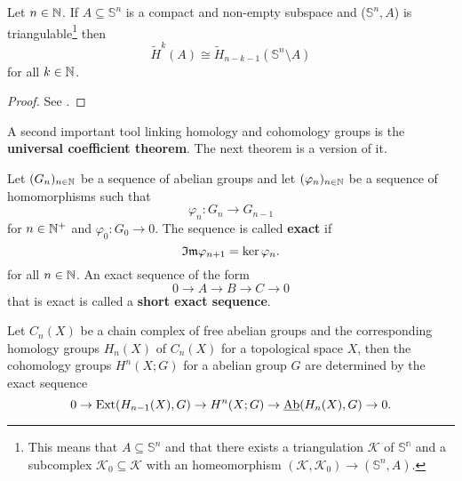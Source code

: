 \begin{thm}\label{thm:alex}
  Let $n \in \mathbb{N}$. If $A \subseteq \mathbb{S}^n$ is a compact and non-empty subspace and ($\mathbb{S}^n, A$) is triangulable\footnote{This means that $A \subseteq \mathbb{S}^n$ and that there exists a triangulation $\mathcal{K}$ of $\mathbb{S^n}$ and a subcomplex $\mathcal{K}_0 \subseteq \mathcal{K}$ with an homeomorphism $(\mathcal{K}, \mathcal{K}_0) \to (\mathbb{S}^n, A)$.} then
  \begin{equation*}
    \tilde{H}^k(A) \cong \tilde{H}_{n-k-1}(\mathbb{S}^n \setminus A)
  \end{equation*}
  for all $k \in \mathbb{N}$.
\end{thm}

\begin{proof}
  See \cite[Theorem 71.1]{MunAlTop}.
\end{proof}

A second important tool linking homology and cohomology groups is the \textbf{universal coefficient theorem}. The next theorem is a version of it.

\begin{defin}
  Let $(G_n)_{n\in\mathbb{N}}$ be a sequence of abelian groups and let $(\varphi_n)_{n\in\mathbb{N}}$ be a sequence of homomorphisms such that
  \begin{equation*}
    \varphi_n\colon G_n \to G_{n-1}
  \end{equation*}
  for $n \in \mathbb{N}^+$ and $\varphi_0\colon G_0 \to 0$.
  The sequence is called \textbf{exact} if
  \begin{equation*}
    \mathfrak{Im}\varphi_{n+1} = \ker\varphi_n.
  \end{equation*}
  for all $n \in \mathbb{N}$.
  An exact sequence of the form
  \begin{equation*}
    0 \to A \to B \to C \to 0
  \end{equation*}
  that is exact is called a \textbf{short exact sequence}.
\end{defin}

\begin{thm}\label{thm:uct}
Let $C_n(X)$ be a chain complex of free abelian groups and the corresponding homology groups $H_n(X)$ of $C_n(X)$ for a topological space $X$, then the cohomology groups $H^n(X; G)$ for a abelian group $G$ are determined by the exact sequence
  \begin{equation*}
    0 \to {\rm Ext}(H_{n-1}(X), G) \to H^n(X; G) \to \underline{\rm Ab}(H_n(X), G) \to 0.
  \end{equation*}
\end{thm}

